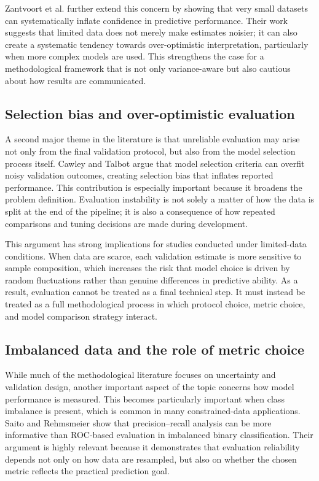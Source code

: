 \documentclass[11pt,a4paper]{article}
\begin{document}
Zantvoort et al. \cite{zantvoort2024minimal} further extend this concern by showing that very small datasets can systematically inflate confidence in predictive performance. Their work suggests that limited data does not merely make estimates noisier; it can also create a systematic tendency towards over-optimistic interpretation, particularly when more complex models are used. This strengthens the case for a methodological framework that is not only variance-aware but also cautious about how results are communicated.

\subsection{Selection bias and over-optimistic evaluation}

A second major theme in the literature is that unreliable evaluation may arise not only from the final validation protocol, but also from the model selection process itself. Cawley and Talbot \cite{cawley2010overfitting} argue that model selection criteria can overfit noisy validation outcomes, creating selection bias that inflates reported performance. This contribution is especially important because it broadens the problem definition. Evaluation instability is not solely a matter of how the data is split at the end of the pipeline; it is also a consequence of how repeated comparisons and tuning decisions are made during development.

This argument has strong implications for studies conducted under limited-data conditions. When data are scarce, each validation estimate is more sensitive to sample composition, which increases the risk that model choice is driven by random fluctuations rather than genuine differences in predictive ability. As a result, evaluation cannot be treated as a final technical step. It must instead be treated as a full methodological process in which protocol choice, metric choice, and model comparison strategy interact.

\subsection{Imbalanced data and the role of metric choice}

While much of the methodological literature focuses on uncertainty and validation design, another important aspect of the topic concerns how model performance is measured. This becomes particularly important when class imbalance is present, which is common in many constrained-data applications. Saito and Rehmsmeier \cite{saito2015precisionrecall} show that precision--recall analysis can be more informative than ROC-based evaluation in imbalanced binary classification. Their argument is highly relevant because it demonstrates that evaluation reliability depends not only on how data are resampled, but also on whether the chosen metric reflects the practical prediction goal.
\end{document}
